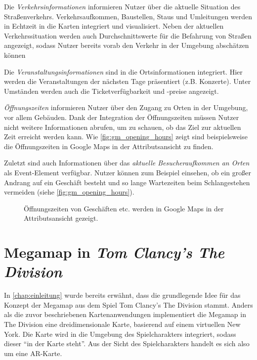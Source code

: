 Die \emph{Verkehrsinformationen} informieren Nutzer über die aktuelle Situation des Straßenverkehrs.
Verkehrsaufkommen, Baustellen, Staus und Umleitungen werden in Echtzeit in die Karten integriert und visualisiert.
Neben der aktuellen Verkehrssituation werden auch Durchschnittswerte für die Befahrung von Straßen angezeigt, sodass Nutzer bereits vorab den Verkehr in der Umgebung abschätzen können

Die \emph{Veranstaltungsinformationen} sind in die Ortsinformationen integriert.
Hier werden die Veranstaltungen der nächsten Tage präsentiert (z.B. Konzerte).
Unter Umständen werden auch die Ticketverfügbarkeit und -preise angezeigt.

\emph{Öffnungszeiten} informieren Nutzer über den Zugang zu Orten in der Umgebung, vor allem Gebäuden.
Dank der Integration der Öffnungszeiten müssen Nutzer nicht weitere Informationen abrufen, um zu schauen, ob das Ziel zur aktuellen Zeit erreicht werden kann.
Wie \autoref{fig:gm_opening_hours} zeigt sind beispielsweise die Öffnungszeiten in Google Maps in der Attributsansicht zu finden.

Zuletzt sind auch Informationen über das \emph{aktuelle Besucheraufkommen an Orten} als Event-Element verfügbar.
Nutzer können zum Beispiel einsehen, ob ein großer Andrang auf ein Geschäft besteht und so lange Wartezeiten beim Schlangestehen vermeiden (siehe \autoref{fig:gm_opening_hours}).
\begin{figure}[th]
	\centering
	\caption{Öffnungszeiten von Geschäften etc. werden in Google Maps in der Attributsansicht gezeigt.}
	\label{fig:gm_opening_hours}
\end{figure}

\section{Megamap in \emph{Tom Clancy's The Division}}
In \autoref{chap:einleitung} wurde bereits erwähnt, dass die grundlegende Idee für das Konzept der Megamap aus dem Spiel Tom Clancy's The Division stammt.
Anders als die zuvor beschriebenen Kartenanwendungen implementiert die Megamap in The Division eine dreidimensionale Karte, basierend auf einem virtuellen New York.
Die Karte wird in die Umgebung des Spielcharakters integriert, sodass dieser \enquote{in der Karte steht}.
Aus der Sicht des Spielcharakters handelt es sich also um eine AR-Karte.

